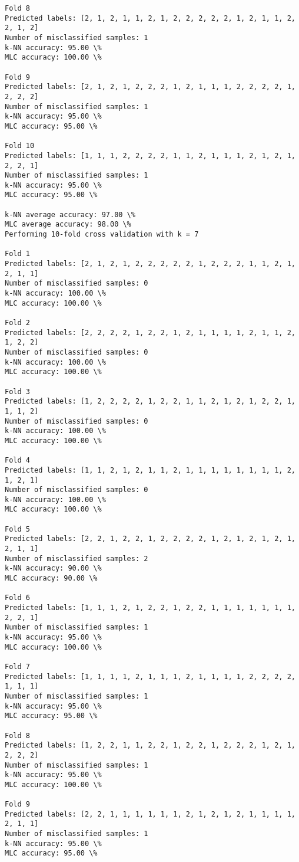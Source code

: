 \documentclass[11pt]{article}
\begin{document}
\begin{Verbatim}[commandchars=\\\{\}]
Fold 8
Predicted labels: [2, 1, 2, 1, 1, 2, 1, 2, 2, 2, 2, 2, 1, 2, 1, 1, 2, 2, 1, 2]
Number of misclassified samples: 1
k-NN accuracy: 95.00 \%
MLC accuracy: 100.00 \%

Fold 9
Predicted labels: [2, 1, 2, 1, 2, 2, 2, 1, 2, 1, 1, 1, 2, 2, 2, 2, 1, 2, 2, 2]
Number of misclassified samples: 1
k-NN accuracy: 95.00 \%
MLC accuracy: 95.00 \%

Fold 10
Predicted labels: [1, 1, 1, 2, 2, 2, 2, 1, 1, 2, 1, 1, 1, 2, 1, 2, 1, 2, 2, 1]
Number of misclassified samples: 1
k-NN accuracy: 95.00 \%
MLC accuracy: 95.00 \%

k-NN average accuracy: 97.00 \%
MLC average accuracy: 98.00 \%
Performing 10-fold cross validation with k = 7

Fold 1
Predicted labels: [2, 1, 2, 1, 2, 2, 2, 2, 2, 1, 2, 2, 2, 1, 1, 2, 1, 2, 1, 1]
Number of misclassified samples: 0
k-NN accuracy: 100.00 \%
MLC accuracy: 100.00 \%

Fold 2
Predicted labels: [2, 2, 2, 2, 1, 2, 2, 1, 2, 1, 1, 1, 1, 2, 1, 1, 2, 1, 2, 2]
Number of misclassified samples: 0
k-NN accuracy: 100.00 \%
MLC accuracy: 100.00 \%

Fold 3
Predicted labels: [1, 2, 2, 2, 2, 1, 2, 2, 1, 1, 2, 1, 2, 1, 2, 2, 1, 1, 1, 2]
Number of misclassified samples: 0
k-NN accuracy: 100.00 \%
MLC accuracy: 100.00 \%

Fold 4
Predicted labels: [1, 1, 2, 1, 2, 1, 1, 2, 1, 1, 1, 1, 1, 1, 1, 1, 2, 1, 2, 1]
Number of misclassified samples: 0
k-NN accuracy: 100.00 \%
MLC accuracy: 100.00 \%

Fold 5
Predicted labels: [2, 2, 1, 2, 2, 1, 2, 2, 2, 2, 1, 2, 1, 2, 1, 2, 1, 2, 1, 1]
Number of misclassified samples: 2
k-NN accuracy: 90.00 \%
MLC accuracy: 90.00 \%

Fold 6
Predicted labels: [1, 1, 1, 2, 1, 2, 2, 1, 2, 2, 1, 1, 1, 1, 1, 1, 1, 2, 2, 1]
Number of misclassified samples: 1
k-NN accuracy: 95.00 \%
MLC accuracy: 100.00 \%

Fold 7
Predicted labels: [1, 1, 1, 1, 2, 1, 1, 1, 2, 1, 1, 1, 1, 2, 2, 2, 2, 1, 1, 1]
Number of misclassified samples: 1
k-NN accuracy: 95.00 \%
MLC accuracy: 95.00 \%

Fold 8
Predicted labels: [1, 2, 2, 1, 1, 2, 2, 1, 2, 2, 1, 2, 2, 2, 1, 2, 1, 2, 2, 2]
Number of misclassified samples: 1
k-NN accuracy: 95.00 \%
MLC accuracy: 100.00 \%

Fold 9
Predicted labels: [2, 2, 1, 1, 1, 1, 1, 1, 2, 1, 2, 1, 2, 1, 1, 1, 1, 2, 1, 1]
Number of misclassified samples: 1
k-NN accuracy: 95.00 \%
MLC accuracy: 95.00 \%


\end{Verbatim}
\end{document}
